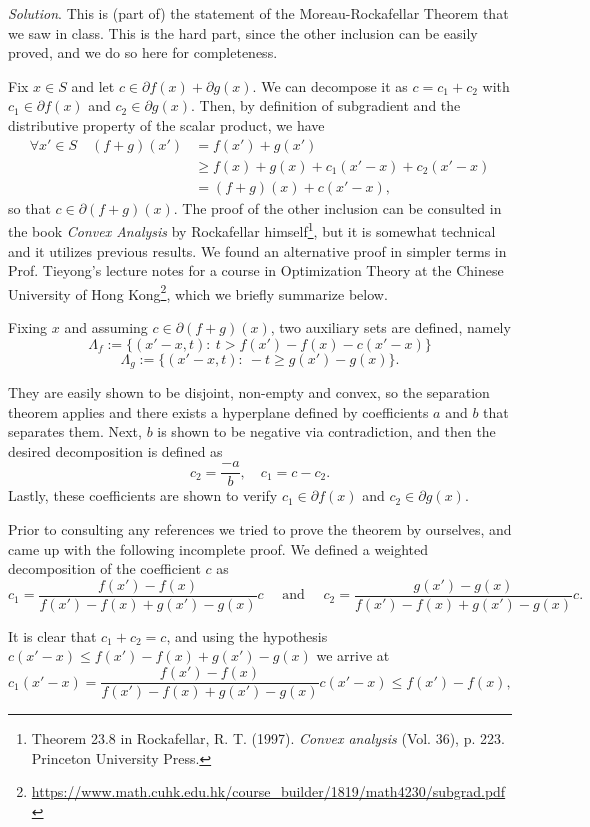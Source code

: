 \documentclass[12pt]{article}
\begin{document}
\emph{Solution}. This is (part of) the statement of the Moreau-Rockafellar Theorem that we saw in class. This is the hard part, since the other inclusion can be easily proved, and we do so here for completeness.\newpage

Fix $x\in S$ and let $c\in \partial f(x) + \partial g(x)$. We can decompose it as $c=c_1+c_2$ with $c_1\in\partial f(x)$ and $c_2\in \partial g(x)$. Then, by definition of subgradient and the distributive property of the scalar product, we have
\begin{align*}
\forall x' \in S \quad (f+g)(x') &= f(x') + g(x')\\
&\geq f(x) + g(x) + c_1(x'-x) + c_2(x'-x)\\
&= (f+g)(x) + c(x'-x),
\end{align*}
so that $c\in \partial(f+g)(x)$. The proof of the other inclusion can be consulted in the book \textit{Convex Analysis} by Rockafellar himself\footnote{Theorem 23.8 in Rockafellar, R. T. (1997). \textit{Convex analysis} (Vol. 36), p. 223. Princeton University Press.}, but it is somewhat technical and it utilizes previous results. We found an alternative proof in simpler terms in Prof. Tieyong's lecture notes for a course in Optimization Theory at the Chinese University of Hong Kong\footnote{\url{https://www.math.cuhk.edu.hk/course_builder/1819/math4230/subgrad.pdf}}, which we briefly summarize below.

Fixing $x$ and assuming $c\in \partial(f+g)(x)$, two auxiliary sets are defined, namely
\[
\Lambda_f := \{(x'-x, t): \ t > f(x')-f(x) - c(x'-x)\}
\]
\[
\Lambda_g := \{(x'-x, t): \ -t \geq g(x')-g(x)\}.
\]

They are easily shown to be disjoint, non-empty and convex, so the separation theorem applies and there exists a hyperplane defined by coefficients $a$ and $b$ that separates them. Next, $b$ is shown to be negative via contradiction, and then the desired decomposition is defined as
\[
c_2=\frac{-a}{b},\quad c_1=c-c_2.
\]
Lastly, these coefficients are shown to verify $c_1\in\partial f(x)$ and $c_2\in\partial g(x)$.

Prior to consulting any references we tried to prove the theorem by ourselves, and came up with the following incomplete proof. We defined a weighted decomposition of the coefficient $c$ as
$$
c_1 = \frac{f(x') - f(x)}{f(x') - f(x) + g(x') - g(x)} c \quad \text{ and } \quad c_2 = \frac{g(x') - g(x)}{f(x') - f(x) + g(x') - g(x)} c.
$$

It is clear that $c_1 + c_2 = c$, and using the hypothesis $ c(x' - x) \leq f(x') - f(x) + g(x') - g(x)$ we arrive at
$$
    c_1(x'-x) = \frac{f(x') - f(x)}{f(x') - f(x) + g(x') - g(x)} c(x'-x) \leq f(x') - f(x),
$$
\end{document}

